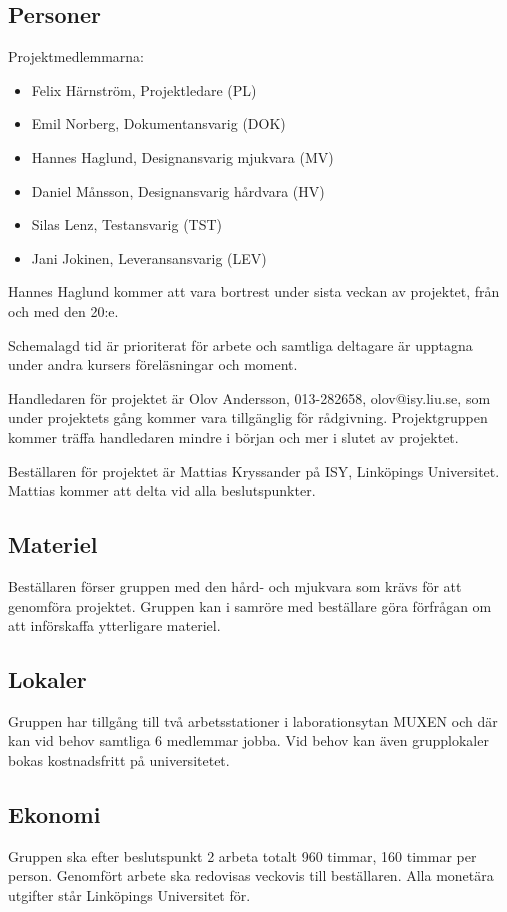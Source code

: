 \documentclass[a4paper,11pt]{article}
\makeatletter
\newcommand{\LIPShandledare}{Olov Andersson, 013-282658, olov@isy.liu.se}
\makeatother
\begin{document}
\subsection{Personer}
Projektmedlemmarna:
\begin{itemize}
	\item Felix Härnström, Projektledare (PL)
	\item Emil Norberg, Dokumentansvarig (DOK)
	\item Hannes Haglund, Designansvarig mjukvara (MV)
	\item Daniel Månsson, Designansvarig hårdvara (HV)
	\item Silas Lenz, Testansvarig (TST)
	\item Jani Jokinen, Leveransansvarig (LEV)
\end{itemize}
Hannes Haglund kommer att vara bortrest under sista veckan av projektet, från och med den 20:e.

Schemalagd tid är prioriterat för arbete och samtliga deltagare är upptagna under andra kursers föreläsningar och moment.

Handledaren för projektet är \LIPShandledare , som under projektets gång kommer vara tillgänglig för rådgivning. Projektgruppen kommer träffa handledaren mindre i början och mer i slutet av projektet.

Beställaren för projektet är  Mattias Kryssander på ISY, Linköpings Universitet. Mattias kommer att delta vid alla beslutspunkter.

\subsection{Materiel}
Beställaren förser gruppen med den hård- och mjukvara som krävs för att genomföra projektet. Gruppen kan i samröre med beställare göra förfrågan om att införskaffa ytterligare materiel. 

\subsection{Lokaler}
Gruppen har tillgång till två arbetsstationer i laborationsytan MUXEN och där kan vid behov samtliga 6 medlemmar jobba. Vid behov kan även grupplokaler bokas kostnadsfritt på universitetet.

\subsection{Ekonomi}
Gruppen ska efter beslutspunkt 2 arbeta totalt 960 timmar, 160 timmar per person. Genomfört arbete ska redovisas veckovis till beställaren. Alla monetära utgifter står Linköpings Universitet för.
\end{document}
